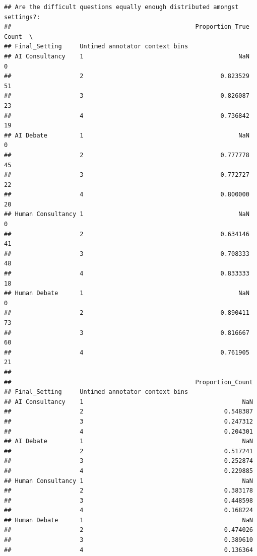 \documentclass[
]{article}
\begin{document}
\begin{verbatim}
## Are the difficult questions equally enough distributed amongst settings?:
##                                                   Proportion_True  Count  \
## Final_Setting     Untimed annotator context bins                           
## AI Consultancy    1                                           NaN      0   
##                   2                                      0.823529     51   
##                   3                                      0.826087     23   
##                   4                                      0.736842     19   
## AI Debate         1                                           NaN      0   
##                   2                                      0.777778     45   
##                   3                                      0.772727     22   
##                   4                                      0.800000     20   
## Human Consultancy 1                                           NaN      0   
##                   2                                      0.634146     41   
##                   3                                      0.708333     48   
##                   4                                      0.833333     18   
## Human Debate      1                                           NaN      0   
##                   2                                      0.890411     73   
##                   3                                      0.816667     60   
##                   4                                      0.761905     21   
## 
##                                                   Proportion_Count  
## Final_Setting     Untimed annotator context bins                    
## AI Consultancy    1                                            NaN  
##                   2                                       0.548387  
##                   3                                       0.247312  
##                   4                                       0.204301  
## AI Debate         1                                            NaN  
##                   2                                       0.517241  
##                   3                                       0.252874  
##                   4                                       0.229885  
## Human Consultancy 1                                            NaN  
##                   2                                       0.383178  
##                   3                                       0.448598  
##                   4                                       0.168224  
## Human Debate      1                                            NaN  
##                   2                                       0.474026  
##                   3                                       0.389610  
##                   4                                       0.136364
\end{verbatim}
\end{document}
